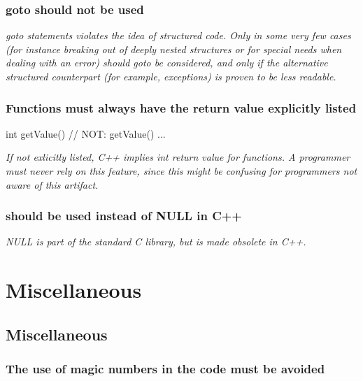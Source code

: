 \documentclass[a4paper,11pt,oneside]{scrbook}
\newcommand{\guideline}[1]{{\subsection{#1}}}
\newcommand{\motivation}[1]{{\normalfont \itshape #1}}
\newcommand{\trcode}[1]{{\normalfont \ttfamily #1}}
\begin{document}
\guideline{\trcode{goto} should not be used}

\motivation{ \trcode{goto} statements violates the idea of structured
  code. Only in some very few cases (for instance breaking out of
  deeply nested structures or for special needs when dealing with an
  error) should \trcode{goto} be considered, and only if the
  alternative structured counterpart (for example, exceptions) is
  proven to be less readable.
}

\guideline{Functions must always have the return value explicitly listed}

\begin{code}
 int getValue() { // NOT: getValue()
   ...
 }
\end{code}

\motivation{
  If not exlicitly listed, C++ implies int return value for functions. A
  programmer must never rely on this feature, since this might be
  confusing for programmers not aware of this artifact.
}

\guideline{\trcode{0} should be used instead of \trcode{NULL} in C++}

\motivation{
  NULL is part of the standard C library, but is made obsolete in C++. 
}

\chapter{Miscellaneous}

\section{Miscellaneous}

\guideline{The use of magic numbers in the code must be avoided}
\end{document}
